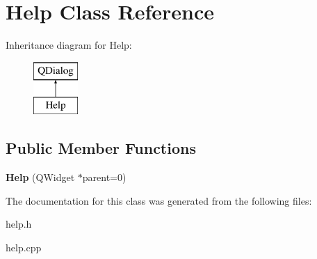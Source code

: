 \hypertarget{class_help}{}\section{Help Class Reference}
\label{class_help}
Inheritance diagram for Help\+:\begin{figure}[H]
\begin{center}
\leavevmode
\includegraphics[height=2.000000cm]{class_help}
\end{center}
\end{figure}
\subsection*{Public Member Functions}
\begin{DoxyCompactItemize}
\item 
\mbox{\label{class_help_a7359f816eb2dab34e4c7017e36c9654d}} 
{\bfseries Help} (Q\+Widget $\ast$parent=0)
\end{DoxyCompactItemize}


The documentation for this class was generated from the following files\+:\begin{DoxyCompactItemize}
\item 
help.\+h\item 
help.\+cpp\end{DoxyCompactItemize}
